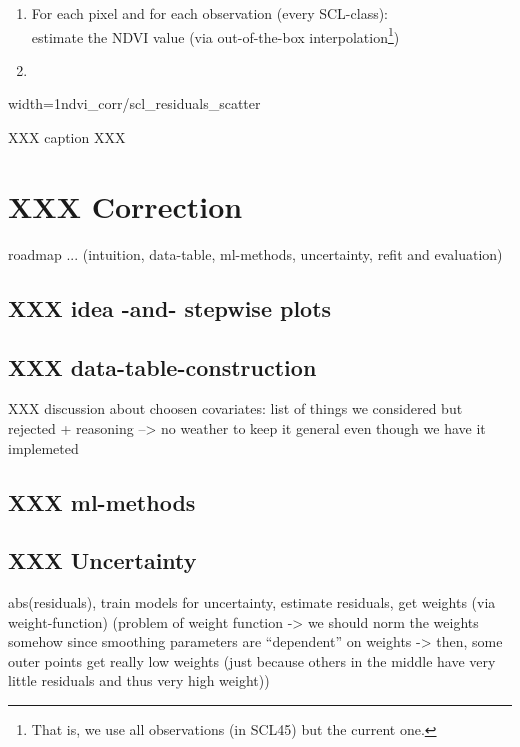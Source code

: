 {    \begin{enumerate}
        \item For each pixel and for each observation (every SCL-class):\\
            estimate the NDVI value (via out-of-the-box interpolation\footnote{That is, we use all observations (in SCL45) but the current one.})
        \item
    \end{enumerate}







    \begin{my_figure}[h]{width=1\textwidth}{ndvi_corr/scl_residuals_scatter}
        \caption{XXX caption XXX}
        \label{fig:ndvi_corr/scl_residuals_scatter}
    \end{my_figure}
}



\section{XXX Correction}{
    roadmap ... (intuition, data-table, ml-methods, uncertainty, refit and evaluation)

    \subsection{XXX idea -and- stepwise plots}
    
    \subsection{XXX data-table-construction}
    XXX discussion about choosen covariates:
    list of things we considered but rejected + reasoning --> no weather to keep it general even though we have it implemeted
    
    \subsection{XXX ml-methods}
    
    \subsection{XXX Uncertainty}
    abs(residuals), train models for uncertainty, estimate residuals, get weights (via weight-function)  (problem of weight function -> we should norm the weights somehow since smoothing parameters are ``dependent'' on weights -> then, some outer points get really low weights (just because others in the middle have very little residuals and thus very high weight))
    
}



